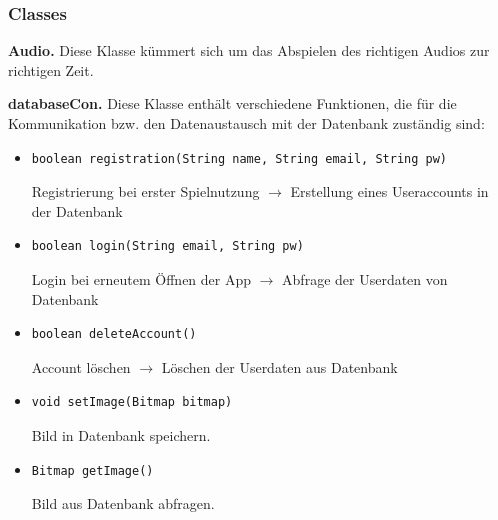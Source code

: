 \documentclass[12pt, a4paper]{article}
\begin{document}
  
		\subsubsection{Classes}		
		
\hspace{0,6 cm}\textbf{Audio.}
Diese Klasse kümmert sich um das Abspielen des richtigen Audios zur richtigen Zeit.

\vspace{0,3 cm}

\textbf{databaseCon.}
Diese Klasse enthält verschiedene Funktionen, die für die Kommunikation bzw. den Datenaustausch mit der Datenbank zuständig sind:

\vspace{-0.1 cm}

\begin{itemize}

\item \begin{verbatim}
boolean registration(String name, String email, String pw)
\end{verbatim} 
\vspace{-0.2 cm}
Registrierung bei erster Spielnutzung $\rightarrow$ Erstellung eines Useraccounts in der Datenbank

\newpage
\item \begin{verbatim}
boolean login(String email, String pw)
\end{verbatim} 
\vspace{-0.2 cm}
Login bei erneutem Öffnen der App $\rightarrow$ Abfrage der Userdaten von Datenbank

\item \begin{verbatim}
boolean deleteAccount()
\end{verbatim}
\vspace{-0.2 cm}
Account löschen $\rightarrow$ Löschen der Userdaten aus Datenbank

\item \begin{verbatim}
void setImage(Bitmap bitmap)
\end{verbatim}
\vspace{-0.2 cm}
Bild in Datenbank speichern.

\item \begin{verbatim}
Bitmap getImage()
\end{verbatim}
\vspace{-0.2 cm}
Bild aus Datenbank abfragen.


\end{itemize}
\end{document}
